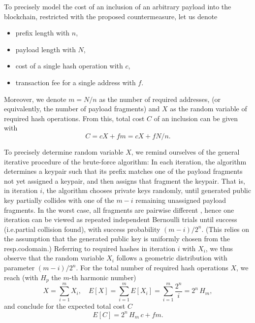 \documentclass[a4paper,11pt,titlepage]{scrbook}
\begin{document}
To precisely model the cost of an inclusion of an arbitrary payload into the blockchain, restricted with the proposed countermeasure, let us denote 
\begin{itemize}[noitemsep]
    \item prefix length with $n$,
    \item payload length with $N$,
    \item cost of a single hash operation with $c$,
    \item transaction fee for a single address with $f$.
\end{itemize}
Moreover, we denote $m=N/n$ as the number of required addresses, (or equivalently, the number of payload fragments) and $X$ as the random variable of required hash operations.
From this, total cost $C$ of an inclusion can be given with
\[ C =  c X + fm = c X + fN/n . \]

To precisely determine random variable $X$, we remind ourselves of the general iterative procedure of the brute-force algorithm:
In each iteration, the algorithm determines a keypair such that its prefix matches one of the payload fragments not yet assigned a keypair, and then assigns that fragment the keypair.
That is, in iteration $i$, the algorithm chooses private keys randomly, until generated public key partially collides with one of the $m-i$ remaining unassigned payload fragments.
In the worst case, all fragments are pairwise different%
, hence one iteration can be viewed as repeated independent Bernoulli trials until success (i.e.\@ partial collision found), with success probability $(m-i)/2^n$.  
(This relies on the assumption that the generated public key is uniformly chosen from the resp.\@ codomain.)
Referring to required hashes in iteration $i$ with $X_i$, we thus observe that the random variable $X_i$ follows a geometric distribution with parameter $(m-i)/2^n$.
For the total number of required hash operations $X$, we reach (with $H_p$ the $m$-th harmonic number)
\[ X = \sum_{i=1}^{m} X_i, \quad E[X] = \sum_{i=1}^{m} E[X_i] = \sum_{i=1}^{m}\frac{2^n}{i} = 2^n\, H_m, \]
and conclude for the expected total cost $C$
\begin{equation}
    E[C] = 2^n\, H_m\,c + fm.\label{eq:totalcost}
\end{equation}

\end{document}
